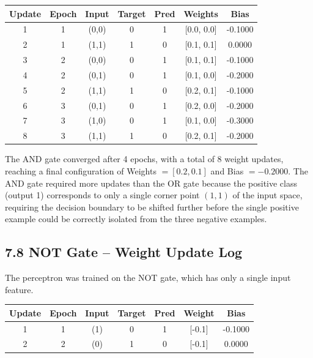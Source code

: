 \documentclass[11pt,a4paper]{article}
\begin{document}
\begin{center}
\begin{tabular}{|c|c|c|c|c|c|c|}
\hline
\textbf{Update} & \textbf{Epoch} & \textbf{Input} & \textbf{Target} & \textbf{Pred} & \textbf{Weights} & \textbf{Bias}\\
\hline
1 & 1 & (0,0) & 0 & 1 & [0.0, 0.0] & -0.1000\\
\hline
2 & 1 & (1,1) & 1 & 0 & [0.1, 0.1] & 0.0000\\
\hline
3 & 2 & (0,0) & 0 & 1 & [0.1, 0.1] & -0.1000\\
\hline
4 & 2 & (0,1) & 0 & 1 & [0.1, 0.0] & -0.2000\\
\hline
5 & 2 & (1,1) & 1 & 0 & [0.2, 0.1] & -0.1000\\
\hline
6 & 3 & (0,1) & 0 & 1 & [0.2, 0.0] & -0.2000\\
\hline
7 & 3 & (1,0) & 0 & 1 & [0.1, 0.0] & -0.3000\\
\hline
8 & 3 & (1,1) & 1 & 0 & [0.2, 0.1] & -0.2000\\
\hline
\end{tabular}
\end{center}

\vspace{0.15cm}

The AND gate converged after 4 epochs, with a total of 8 weight updates, reaching a final configuration of Weights $= [0.2, 0.1]$ and Bias $= -0.2000$. The AND gate required more updates than the OR gate because the positive class (output 1) corresponds to only a single corner point $(1,1)$ of the input space, requiring the decision boundary to be shifted further before the single positive example could be correctly isolated from the three negative examples.


\subsection*{7.8 NOT Gate -- Weight Update Log}

The perceptron was trained on the NOT gate, which has only a single input feature.

\begin{center}
\begin{tabular}{|c|c|c|c|c|c|c|}
\hline
\textbf{Update} & \textbf{Epoch} & \textbf{Input} & \textbf{Target} & \textbf{Pred} & \textbf{Weight} & \textbf{Bias}\\
\hline
1 & 1 & (1) & 0 & 1 & [-0.1] & -0.1000\\
\hline
2 & 2 & (0) & 1 & 0 & [-0.1] & 0.0000\\
\hline
\end{tabular}
\end{center}
\end{document}
